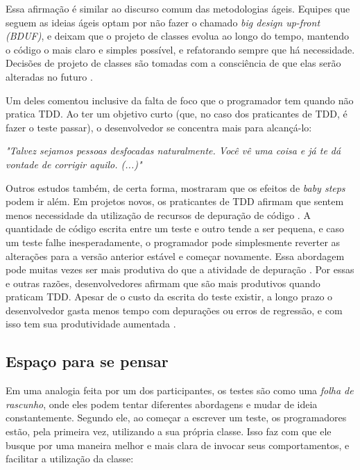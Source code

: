 Essa afirmação é similar ao discurso comum das metodologias ágeis.
Equipes que seguem as ideias ágeis optam por não fazer o chamado \textit{big design up-front (BDUF)},
e deixam que o projeto de classes evolua ao longo do tempo, mantendo o código o mais claro e
simples possível, e refatorando sempre que há necessidade. Decisões de
projeto de classes são tomadas com a consciência de que elas serão alteradas no futuro
\cite{is-design-dead}.

Um deles comentou inclusive da falta de foco que o programador tem quando não pratica TDD.
Ao ter um objetivo curto (que, no caso dos praticantes de TDD, é fazer o teste passar), o
desenvolvedor se concentra mais para alcançá-lo:

\begin{framed}
\textit{"Talvez sejamos pessoas desfocadas naturalmente. Você vê uma coisa e já te dá vontade
de corrigir aquilo. (...)"}
\end{framed}

Outros estudos também, de certa forma, mostraram que os efeitos de \textit{baby steps}
podem ir além.
Em projetos novos, os praticantes de TDD afirmam que sentem menos necessidade da
utilização de recursos de depuração de código \cite{george-williams-experiment} 
\cite{janzen-arch-improvement}. 
A quantidade de código
escrita entre um teste e outro tende a ser pequena, e caso um teste falhe
inesperadamente, o programador pode simplesmente reverter as alterações para a 
versão anterior estável e começar novamente. Essa abordagem pode muitas vezes
ser mais produtiva do que a atividade de depuração 
\cite{janzen-arch-improvement}. Por essas e outras razões, desenvolvedores afirmam 
que são mais produtivos quando praticam TDD. Apesar de o custo da escrita do teste
existir, a longo prazo o desenvolvedor gasta menos tempo com depurações ou 
erros de regressão, e com isso tem sua produtividade aumentada
\cite{george-e-williams}.

\subsection{Espaço para se pensar}

Em uma analogia feita por um dos participantes, os testes são como uma 
\textit{folha de rascunho}, 
onde eles podem tentar diferentes abordagens e mudar de ideia constantemente. Segundo ele,
ao começar a escrever um teste, os programadores estão, pela primeira vez, utilizando a sua 
própria classe. Isso faz com que ele busque por uma maneira melhor e mais clara de invocar
seus comportamentos, e facilitar a utilização da classe:

